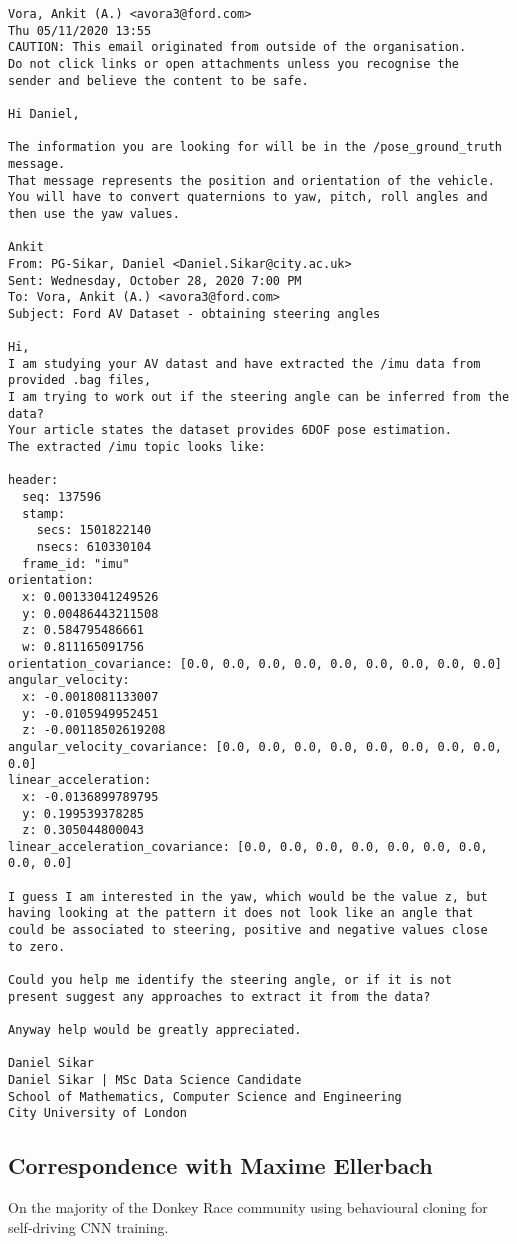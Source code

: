 \begin{verbatim}
Vora, Ankit (A.) <avora3@ford.com>
Thu 05/11/2020 13:55
CAUTION: This email originated from outside of the organisation. 
Do not click links or open attachments unless you recognise the
sender and believe the content to be safe.

Hi Daniel,

The information you are looking for will be in the /pose_ground_truth message. 
That message represents the position and orientation of the vehicle.
You will have to convert quaternions to yaw, pitch, roll angles and
then use the yaw values.

Ankit
From: PG-Sikar, Daniel <Daniel.Sikar@city.ac.uk>
Sent: Wednesday, October 28, 2020 7:00 PM
To: Vora, Ankit (A.) <avora3@ford.com>
Subject: Ford AV Dataset - obtaining steering angles
 
Hi,
I am studying your AV datast and have extracted the /imu data from provided .bag files, 
I am trying to work out if the steering angle can be inferred from the data?
Your article states the dataset provides 6DOF pose estimation.
The extracted /imu topic looks like:

header:
  seq: 137596
  stamp:
    secs: 1501822140
    nsecs: 610330104
  frame_id: "imu"
orientation:
  x: 0.00133041249526
  y: 0.00486443211508
  z: 0.584795486661
  w: 0.811165091756
orientation_covariance: [0.0, 0.0, 0.0, 0.0, 0.0, 0.0, 0.0, 0.0, 0.0]
angular_velocity:
  x: -0.0018081133007
  y: -0.0105949952451
  z: -0.00118502619208
angular_velocity_covariance: [0.0, 0.0, 0.0, 0.0, 0.0, 0.0, 0.0, 0.0, 0.0]
linear_acceleration:
  x: -0.0136899789795
  y: 0.199539378285
  z: 0.305044800043
linear_acceleration_covariance: [0.0, 0.0, 0.0, 0.0, 0.0, 0.0, 0.0, 0.0, 0.0]

I guess I am interested in the yaw, which would be the value z, but
having looking at the pattern it does not look like an angle that
could be associated to steering, positive and negative values close
to zero.

Could you help me identify the steering angle, or if it is not
present suggest any approaches to extract it from the data?

Anyway help would be greatly appreciated.

Daniel Sikar
Daniel Sikar | MSc Data Science Candidate
School of Mathematics, Computer Science and Engineering
City University of London   
\end{verbatim}

\subsection{Correspondence with Maxime Ellerbach}
\label{corr:ellerbach}
On the majority of the Donkey Race community using behavioural cloning for self-driving CNN training.

